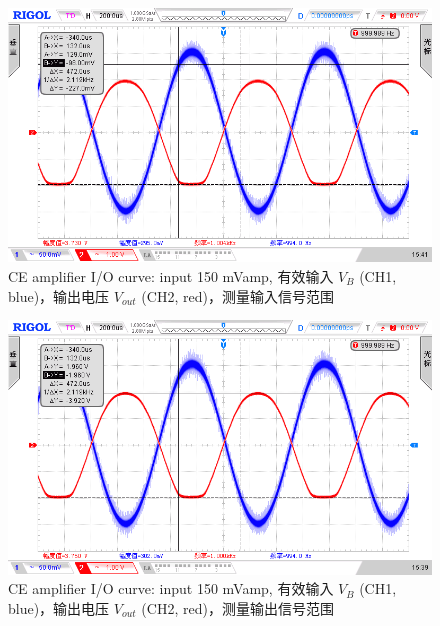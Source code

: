 \documentclass[UTF8]{article}
\begin{document}
\begin{figure}[H]\centering
    \includegraphics[width=\columnwidth]{LCE-02-三极管/assets/CE 截止与饱和失真 - Vin 范围, input 150 mVamp.png}
    \caption{CE amplifier I/O curve: input 150 mVamp, 有效输入 $V_{B}$ (CH1, blue)，输出电压 $V_{out}$ (CH2, red)，测量输入信号范围}
\end{figure}
\begin{figure}[H]\centering
    \includegraphics[width=\columnwidth]{LCE-02-三极管/assets/CE 截止与饱和失真 - Vout 范围, input 150 mVamp.png}
    \caption{CE amplifier I/O curve: input 150 mVamp, 有效输入 $V_{B}$ (CH1, blue)，输出电压 $V_{out}$ (CH2, red)，测量输出信号范围}
\end{figure}
\end{document}
